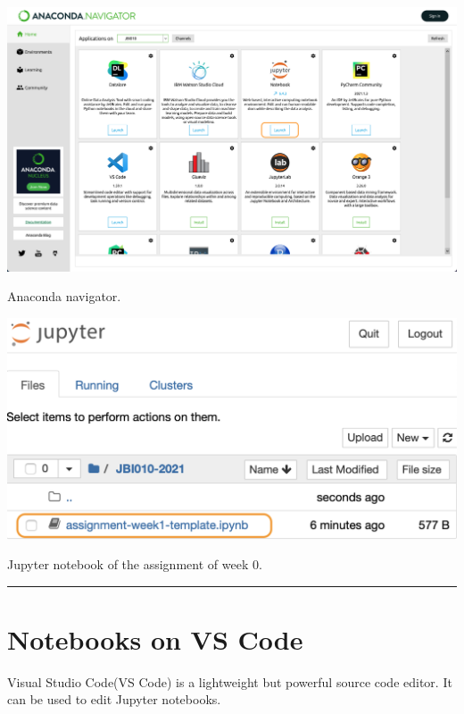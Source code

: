 \documentclass{latex-template/tufte-handout}
\begin{document}
\begin{marginfigure}%
  \includegraphics[width=1.3\linewidth]{assets/06-launch-jupyter}
  \caption{Anaconda navigator.}
  \label{fig:anaconda-navigator}
\end{marginfigure}



\begin{marginfigure}%
  \includegraphics[width=1.2\linewidth]{assets/open-nb}
  \caption{Jupyter notebook of the assignment of week 0.}
  \label{fig:week-0}
\end{marginfigure}

\begin{center}\rule{\linewidth}{0.5pt}\end{center}


\section{Notebooks on VS Code}
Visual Studio Code(VS Code) is a lightweight but powerful source code editor. It can be used to edit Jupyter notebooks.
\end{document}

